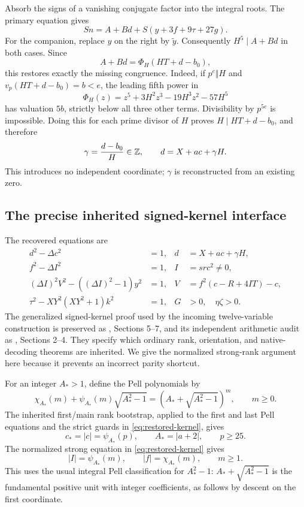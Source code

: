 Absorb the signs of a vanishing conjugate factor into the integral
roots. The primary equation gives
\begin{equation}\label{eq:root-sum}
 Sn=A+Bd+S(y+3f+9\tau+27g).
\end{equation}
For the companion, replace $y$ on the right by $\widetilde y$.
Consequently $H^5\mid A+Bd$ in both cases. Since
\[
 A+Bd=\Phi_H(HT+d-b_0),
\]
this restores exactly the missing congruence. Indeed, if $p^e\Vert H$
and $v_p(HT+d-b_0)=b<e$, the leading fifth power in
\[
 \Phi_H(z)=z^5+3H^2z^3-19H^3z^2-57H^5
\]
has valuation $5b$, strictly below all three other terms. Divisibility
by $p^{5e}$ is impossible. Doing this for each prime divisor of $H$
proves $H\mid HT+d-b_0$, and therefore
\begin{equation}\label{eq:gamma-restored}
 \gamma=\frac{d-b_0}{H}\in\mathbb Z,\qquad d=X+ac+\gamma H.
\end{equation}
This introduces no independent coordinate; $\gamma$ is reconstructed
from an existing zero.

\subsection{The precise inherited signed-kernel interface}

The recovered equations are
\begin{align}
 d^2-\Delta c^2&=1,& d&=X+ac+\gamma H,\nonumber\\
 f^2-\Delta I^2&=1,& I&=src^2\ne0,\nonumber\\
 (\Delta I)^2V^2-((\Delta I)^2-1)y^2&=1,&
 V&=f^2(c-R+4IT)-c,\nonumber\\
 \tau^2-XY^2(XY^2+1)k^2&=1,&
 G&>0,\quad\eta\zeta>0. \label{eq:restored-kernel}
\end{align}
The generalized signed-kernel proof used by the incoming twelve-variable
construction is preserved as
, Sections 5--7, and its
independent arithmetic audit as
, Sections 2--4.
They specify which ordinary rank, orientation, and native-decoding
theorems are inherited. We give the normalized strong-rank argument here
because it prevents an incorrect parity shortcut.

For an integer $A_*>1$, define the Pell polynomials by
\begin{equation}\label{eq:pell-def}
 \chi_{A_*}(m)+\psi_{A_*}(m)\sqrt{A_*^2-1}
   =(A_*+\sqrt{A_*^2-1})^m,\qquad m\ge0.
\end{equation}
The inherited first/main rank bootstrap, applied to the first and last
Pell equations and the strict guards in \eqref{eq:restored-kernel},
gives
\[
 c_*=|c|=\psi_{A_*}(p),\qquad A_*=|a+2|,\qquad p\ge25.
\]
The normalized strong equation in \eqref{eq:restored-kernel} gives
\[
 |I|=\psi_{A_*}(m),\qquad |f|=\chi_{A_*}(m),\qquad m\ge1.
\]
This uses the usual integral Pell classification for
$A_*^2-1$: $A_*+\sqrt{A_*^2-1}$ is the fundamental positive unit
with integer coefficients, as follows by descent on the first coordinate.

